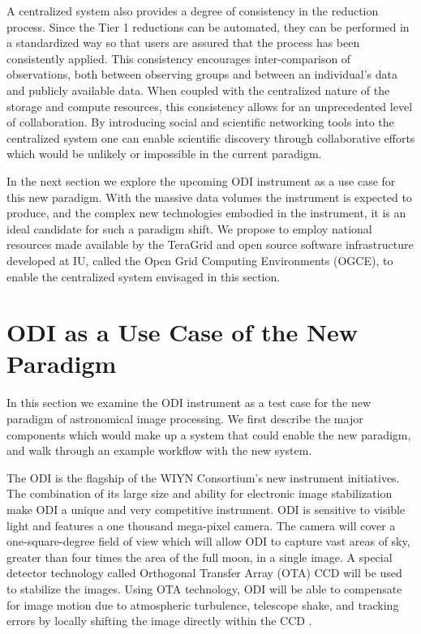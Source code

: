 \documentclass[10pt,conference]{IEEEtran}
\begin{document}
A centralized system also provides a degree of consistency in the reduction process. Since the Tier 1 reductions can be automated, they can be performed in a standardized way so that users are assured that the process has been consistently applied. This consistency encourages inter-comparison of observations, both between observing groups and between an individual's data and publicly available data. When coupled with the centralized nature of the storage and compute resources, this consistency allows for an unprecedented level of collaboration. By introducing social and scientific networking tools into the centralized system one can enable scientific discovery through collaborative efforts which would be unlikely or impossible in the current paradigm. 

In the next section we explore the upcoming ODI instrument as a use case for this new paradigm. With the massive data volumes the instrument is expected to produce, and the complex new technologies embodied in the instrument, it is an ideal candidate for such a paradigm shift. We propose to employ national resources made available by the TeraGrid and open source software infrastructure developed at IU, called the Open Grid Computing Environments (OGCE), to enable the centralized system envisaged in this section. 

\section{ODI as a Use Case of the New Paradigm}\label{sec:ODI}

In this section we examine the ODI instrument as a test case for the new paradigm of astronomical image processing. We first describe the major components which would make up a system that could enable the new paradigm, and walk through an example workflow with the new system.

The ODI is the flagship of the WIYN Consortium's new instrument initiatives. The combination of its large size and ability for electronic image stabilization make ODI a unique and very competitive instrument. ODI is sensitive to visible light and features a one thousand mega-pixel camera. The camera will cover a one-square-degree field of view which will allow ODI to capture vast areas of sky, greater than four times the area of the full moon, in a single image. A special detector technology called Orthogonal Transfer Array (OTA) CCD will be used to stabilize the images. Using OTA technology, ODI will be able to compensate for image motion due to atmospheric turbulence, telescope shake, and tracking errors by locally shifting the image directly within the CCD \cite{ODI}.  
\end{document}
